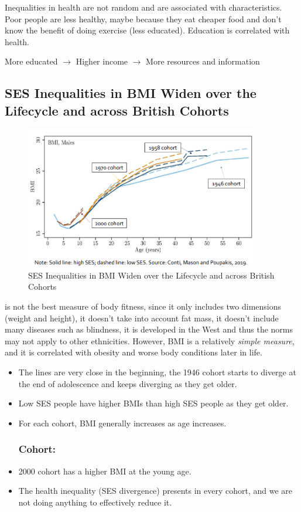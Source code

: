     Inequalities in health are not random and are associated with characteristics. Poor people are less healthy, maybe because they eat cheaper food and don't know the benefit of doing exercise (less educated). Education is correlated with health.

    More educated  $\to$  Higher income  $\to$  More resources and information

    \subsection{SES Inequalities in BMI Widen over the Lifecycle and across British Cohorts}
    
        \begin{figure}[H]%
            \centering
            \includegraphics[width=4in]{images/ch3/27.png}
            \caption{SES Inequalities in BMI Widen over the Lifecycle and across British Cohorts}
        \end{figure}
         is not the best measure of body fitness, since it only includes two dimensions (weight and height), it doesn't take into account fat mass, it doesn't include many diseases such as blindness, it is developed in the West and thus the norms may not apply to other ethnicities. However, BMI is a relatively \emph{simple measure}, and it is correlated with obesity and worse body conditions later in life.
        \begin{itemize}
            \subsubsection{Lifecycle:}
            \item The lines are very close in the beginning, the 1946 cohort starts to diverge at the end of adolescence and keeps diverging as they get older. 
            \item Low SES people have higher BMIs than high SES people as they get older.
            \item For each cohort, BMI generally increases as age increases. 
            \subsubsection{Cohort:}
            \item 2000 cohort has a higher BMI at the young age.
            \item The health inequality (SES divergence) presents in every cohort, and we are not doing anything to effectively reduce it.
        \end{itemize}       
